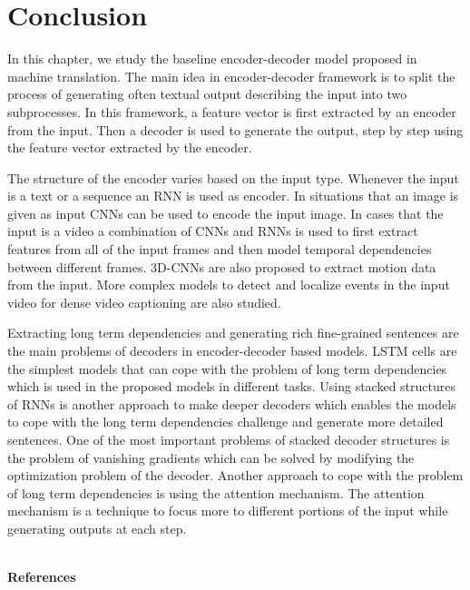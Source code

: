 \documentclass[preprint, 12pt]{elsarticle}
\begin{document}
		\section{Conclusion}
		In this chapter, we study the baseline encoder-decoder model proposed in machine translation. The main idea in encoder-decoder framework is to split the process of generating often textual output describing the input into two subprocesses. In this framework, a feature vector is first extracted by an encoder from the input. Then a decoder is used to generate the output, step by step using the feature vector extracted by the encoder. 
		
		The structure of the encoder varies based on the input type. Whenever the input is a text or a sequence an RNN is used as encoder. In situations that an image is given as input CNNs can be used to encode the input image. In cases that the input is a video a combination of CNNs and RNNs is used to first extract features from all of the input frames and then model temporal dependencies between different frames. 3D-CNNs are also proposed to extract motion data from the input. More complex models to detect and localize events in the input video for dense video captioning are also studied.
		
		Extracting long term dependencies and generating rich fine-grained sentences are the main problems of decoders in encoder-decoder based models. LSTM cells are the simplest models that can cope with the problem of long term dependencies which is used in the proposed models in different tasks. Using stacked structures of RNNs is another approach to make deeper decoders which enables the models to cope with the long term dependencies challenge and generate more detailed sentences. One of the most important problems of stacked decoder structures is the problem of vanishing gradients which can be solved by modifying the optimization problem of the decoder. Another approach to cope with the problem of long term dependencies is using the attention mechanism. The attention mechanism is a technique to focus more to different portions of the input while generating outputs at each step. 
		\\
		\\
	\begin{large}
		\textbf{References}
	\end{large}
		
	
	
\end{document}
